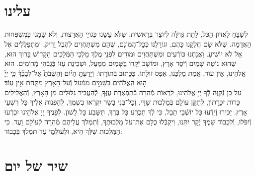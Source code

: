\documentclass[twoside, openany, parskip=half, 11pt]{book}
\begin{document}
\uvaletzion

\\
\\


\label{end of shacharis}
\fullkaddish

\section*{ עלינו }

\newcommand{\aleinu}{
\firstword{עָלֵֽינוּ}
לְֿשַׁבֵּחַ לַאֲדוֹן הַכֹּל, לָתֵת גְּֿדֻלָּה לְֿיוֹצֵר בְּֿרֵאשִׁית, שֶׁלֹּא עָשָׂנוּ כְּֿגוֹיֵי הָאֲרָצוֹת, וְֿלֹא שָׂמָנוּ כְּֿמִשְׁפְּֿחוֹת הָאֲדָמָה. שֶׁלֹּא שָׂם חֶלְקֵנוּ כָּהֶם, וגוֹרָלֵנוּ כְּֿכׇל־הֲמוֹנָם, שֶׁהֵם מִשְׁתַּחֲוִים לְֿהֶבֶל וָרִיק, וּמִתְפַּלֲּלִים אֶל אֵל לֹא יוֹשִׁיעַ. וַאֲנַחְנוּ כּוֹרְֿעִים וּמִשְׁתַּחֲוִים וּמוֹדִים לִפְנֵי מֶלֶךְ מַלְכֵי הַמְּֿלָכִים הַקָּדוֹשׁ בָּרוּךְ הוּא, שֶׁהוּא נוֹטֶה שָׁמַיִם וְֿיֹסֵד אָרֶץ, וּמוֹשַׁב יְֿקָרוֹ בַּשָּׁמַיִם מִמַּעַל, וּשְׁכִינַת עֻזּוֹ בְּֿגָבְֿהֵי מְֿרוֹמִים. הוּא אֱלֹהֵינוּ, אֵין עוֹד, אֱמֶת מַלְכֵּנוּ, אֶפֶס זוּלָתוֹ. כַּכָּתוּב בְּֿתּוֹרָתוֹ: וְֿיָדַעְתָּ֣
\source{דברים ד}
הַיּ֗וֹם וַהֲשֵׁבֹתָ֮ אֶל־לְבָבֶ֒ךָ֒ כִּ֤י יְיָ֙ ה֣וּא הָֽאֱלֹהִ֔ים בַּשָּׁמַ֣יִם מִמַּ֔עַל וְֿעַל־הָאָ֖רֶץ מִתָּ֑חַת אֵ֖ין עֽוֹד׃\\
עַל כֵּן נְֿקַוֶּה לְֿךָ יְיָ אֱלֹהֵינוּ, לִרְאוֹת מְֿהֵרָה בְּֿתִפְאֶרֶת עֻזֶּךָ, לְֿהַעֲבִיר גִּלּוּלִים מִן הָאָרֶץ, וְֿהָאֱלִילִים כָּרוֹת יִכָּרֵתוּן, לְֿתַקֵּן עוֹלָם בְּֿמַלְכוּת שַׁדַּי, וְֿכׇל־בְּנֵי בָשָׂר יִקְרְֿאוּ בִשְׁמֶךָ, לְֿהַפְנוֹת אֵלֶיךָ כָּל רִשְׁעֵי אָרֶץ. יַכִּירוּ וְֿיֵדְֿעוּ כָּל יוֹשְֿֿׁבֵי תֵבֵל, כִּי לְֿךָ תִכְרַע כָּל בֶּרֶךְ, תִּשָּׁבַע כָּל לָשׁוֹן. לְֿפָנֶיךָ יְיָ אֱלֹהֵינוּ יִכְרְֿעוּ וְֿיִפֹּלוּ, וְֿלִכְבוֹד שִׁמְךָ יְֿקָר יִתֵּנוּ, \adforn{14} וִיקַבְּֿלוּ כֻלָּם אֶת־עֹל מַלְכוּתֶךָ, וְֿתִמְלֹךְ עֲלֵיהֶם מְֿהֵרָה לְֿעוֹלָם וָעֶד. כִּי הַמַּלְכוּת שֶׁלְּֿךָ הִיא, וּלְעוֹלְֿמֵי עַד תִּמְלֹךְ בְּֿכָבוֹד:
}

\aleinu


\section[שיר של יום]{ שיר של יום }
\label{shir_shel_yom}

\\
\vspace{-1.5\baselineskip}
\kafdalet
\end{document}
